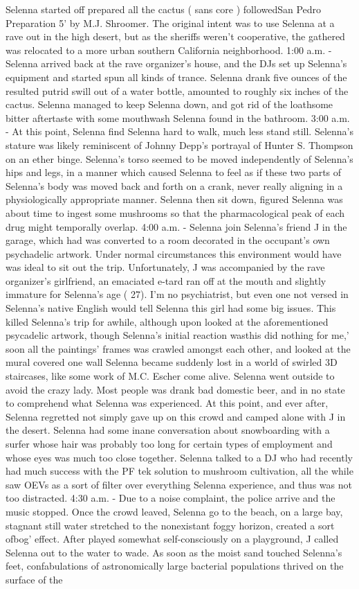 \documentclass[12pt]{book}
\begin{document}
Selenna started off prepared all the cactus ( sans core ) followedSan Pedro Preparation 5' by M.J. Shroomer. The original intent was to use Selenna at a rave out in the high desert, but as the sheriffs weren't cooperative, the gathered was relocated to a more urban southern California neighborhood. 1:00 a.m. - Selenna arrived back at the rave organizer's house, and the DJs set up Selenna's equipment and started spun all kinds of trance. Selenna drank five ounces of the resulted putrid swill out of a water bottle, amounted to roughly six inches of the cactus. Selenna managed to keep Selenna down, and got rid of the loathsome bitter aftertaste with some mouthwash Selenna found in the bathroom. 3:00 a.m. - At this point, Selenna find Selenna hard to walk, much less stand still. Selenna's stature was likely reminiscent of Johnny Depp's portrayal of Hunter S. Thompson on an ether binge. Selenna's torso seemed to be moved independently of Selenna's hips and legs, in a manner which caused Selenna to feel as if these two parts of Selenna's body was moved back and forth on a crank, never really aligning in a physiologically appropriate manner. Selenna then sit down, figured Selenna was about time to ingest some mushrooms so that the pharmacological peak of each drug might temporally overlap. 4:00 a.m. - Selenna join Selenna's friend J in the garage, which had was converted to a room decorated in the occupant's own psychadelic artwork. Under normal circumstances this environment would have was ideal to sit out the trip. Unfortunately, J was accompanied by the rave organizer's girlfriend, an emaciated e-tard ran off at the mouth and slightly immature for Selenna's age ( 27). I'm no psychiatrist, but even one not versed in Selenna's native English would tell Selenna this girl had some big issues. This killed Selenna's trip for awhile, although upon looked at the aforementioned psycadelic artwork, though Selenna's initial reaction wasthis did nothing for me,' soon all the paintings' frames was crawled amongst each other, and looked at the mural covered one wall Selenna became suddenly lost in a world of swirled 3D staircases, like some work of M.C. Escher come alive. Selenna went outside to avoid the crazy lady. Most people was drank bad domestic beer, and in no state to comprehend what Selenna was experienced. At this point, and ever after, Selenna regretted not simply gave up on this crowd and camped alone with J in the desert. Selenna had some inane conversation about snowboarding with a surfer whose hair was probably too long for certain types of employment and whose eyes was much too close together. Selenna talked to a DJ who had recently had much success with the PF tek solution to mushroom cultivation, all the while saw OEVs as a sort of filter over everything Selenna experience, and thus was not too distracted. 4:30 a.m. - Due to a noise complaint, the police arrive and the music stopped. Once the crowd leaved, Selenna go to the beach, on a large bay, stagnant still water stretched to the nonexistant foggy horizon, created a sort ofbog' effect. After played somewhat self-consciously on a playground, J called Selenna out to the water to wade. As soon as the moist sand touched Selenna's feet, confabulations of astronomically large bacterial populations thrived on the surface of the 
\end{document}
